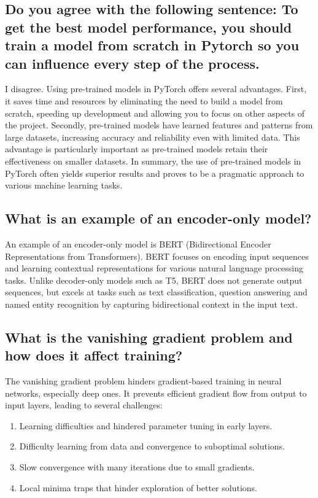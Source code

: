 \documentclass{article}
\begin{document}
\subsection{Do you agree with the following sentence: To get the best model performance, you should train a model from scratch in Pytorch so you can influence every step of the process.}

I disagree.
Using pre-trained models in PyTorch offers several advantages.
First, it saves time and resources by eliminating the need to build a model from scratch, speeding up development and allowing you to focus on other aspects of the project.
Secondly, pre-trained models have learned features and patterns from large datasets, increasing accuracy and reliability even with limited data.
This advantage is particularly important as pre-trained models retain their effectiveness on smaller datasets.
In summary, the use of pre-trained models in PyTorch often yields superior results and proves to be a pragmatic approach to various machine learning tasks.


\subsection{What is an example of an encoder-only model?}

An example of an encoder-only model is BERT (Bidirectional Encoder Representations from Transformers).
BERT focuses on encoding input sequences and learning contextual representations for various natural language processing tasks.
Unlike decoder-only models such as T5, BERT does not generate output sequences, but excels at tasks such as text classification, question answering and named entity recognition by capturing bidirectional context in the input text.


\subsection{ What is the vanishing gradient problem and how does it affect training?}

The vanishing gradient problem hinders gradient-based training in neural networks, especially deep ones.
It prevents efficient gradient flow from output to input layers, leading to several challenges:

\begin{enumerate}
    \item Learning difficulties and hindered parameter tuning in early layers.
    \item Difficulty learning from data and convergence to suboptimal solutions.
    \item Slow convergence with many iterations due to small gradients.
    \item Local minima traps that hinder exploration of better solutions.
\end{enumerate}
\end{document}
